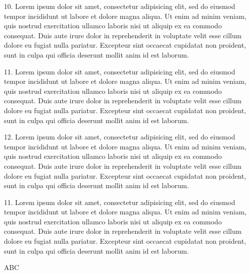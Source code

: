 \documentclass[11pt]{article}
\begin{document}
10. Lorem ipsum dolor sit amet, consectetur adipisicing elit, sed do eiusmod tempor incididunt ut labore et dolore magna aliqua. Ut enim ad minim veniam, quis nostrud exercitation ullamco laboris nisi ut aliquip ex ea commodo consequat. Duis aute irure dolor in reprehenderit in voluptate velit esse cillum dolore eu fugiat nulla pariatur. Excepteur sint occaecat cupidatat non proident, sunt in culpa qui officia deserunt mollit anim id est laborum.

11. Lorem ipsum dolor sit amet, consectetur adipisicing elit, sed do eiusmod tempor incididunt ut labore et dolore magna aliqua. Ut enim ad minim veniam, quis nostrud exercitation ullamco laboris nisi ut aliquip ex ea commodo consequat. Duis aute irure dolor in reprehenderit in voluptate velit esse cillum dolore eu fugiat nulla pariatur. Excepteur sint occaecat cupidatat non proident, sunt in culpa qui officia deserunt mollit anim id est laborum.

12. Lorem ipsum dolor sit amet, consectetur adipisicing elit, sed do eiusmod tempor incididunt ut labore et dolore magna aliqua. Ut enim ad minim veniam, quis nostrud exercitation ullamco laboris nisi ut aliquip ex ea commodo consequat. Duis aute irure dolor in reprehenderit in voluptate velit esse cillum dolore eu fugiat nulla pariatur. Excepteur sint occaecat cupidatat non proident, sunt in culpa qui officia deserunt mollit anim id est laborum.

11. Lorem ipsum dolor sit amet, consectetur adipisicing elit, sed do eiusmod tempor incididunt ut labore et dolore magna aliqua. Ut enim ad minim veniam, quis nostrud exercitation ullamco laboris nisi ut aliquip ex ea commodo consequat. Duis aute irure dolor in reprehenderit in voluptate velit esse cillum dolore eu fugiat nulla pariatur. Excepteur sint occaecat cupidatat non proident, sunt in culpa qui officia deserunt mollit anim id est laborum.

ABC
\end{document}
